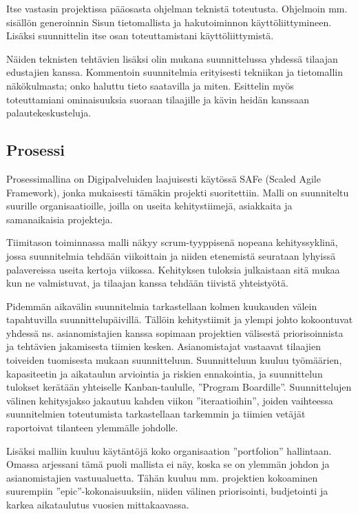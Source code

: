 \documentclass{article}
\begin{document}
Itse vastasin projektissa pääosasta ohjelman teknistä toteutusta. Ohjelmoin mm.
sisällön generoinnin Sisun tietomallista ja hakutoiminnon käyttöliittymineen.
Lisäksi suunnittelin itse osan toteuttamistani käyttöliittymistä.

Näiden teknisten tehtävien lisäksi olin mukana suunnittelussa yhdessä tilaajan
edustajien kanssa. Kommentoin suunnitelmia erityisesti tekniikan ja tietomallin
näkökulmasta; onko haluttu tieto saa\-ta\-vil\-la ja mi\-ten. Esittelin myös
toteuttamiani ominaisuuksia suoraan tilaajille ja kävin heidän kans\-saan
palaute\-kes\-kus\-teluja.

\subsection{Prosessi}

Prosessimallina on Digipalveluiden laajuisesti käytössä SAFe (Scaled Agile
Framework), jonka mu\-kai\-ses\-ti tämäkin projekti suoritettiin. Malli on
suunniteltu suurille organisaatioille, joilla on useita kehitystiimejä,
asiakkaita ja samanaikaisia projekteja.

Tiimitason toiminnassa malli näkyy scrum-tyyppisenä nopeana kehityssyklinä,
jossa suunnitelmia tehdään viikoittain ja niiden etenemistä seurataan lyhyissä
palavereissa useita kertoja viikossa. Kehityksen tuloksia julkaistaan sitä
mukaa kun ne valmistuvat, ja tilaajan kanssa tehdään tiivistä yhteis\-työtä.

Pidemmän aikavälin suunnitelmia tarkastellaan kolmen kuukauden välein
tapahtuvilla suunnittelu\-päivillä. Tällöin kehitystiimit ja ylempi johto
kokoontuvat yhdessä ns. asianomistajien kanssa sopimaan projektien välisestä
priorisoinnista ja tehtävien jakamisesta tiimien kesken. Asianomistajat
vastaavat tilaajien toiveiden tuomisesta mukaan suunnitteluun. Suunnitteluun
kuuluu työmäärien, kapasiteetin ja aikataulun arviointia ja riskien
ennakointia, ja suunnittelun tulokset kerätään yhtei\-selle Kanban-taululle,
''Program Boardille''.  Suunnittelujen välinen kehitysjakso jakautuu kahden
viikon ''iteraatioihin'', joiden vaihteessa suunnitelmien toteutumista
tarkastellaan tarkemmin ja tii\-mien vetä\-jät raportoivat tilanteen ylemmälle
johdolle.

Lisäksi malliin kuuluu käytäntöjä koko organisaation ''portfolion'' hallintaan.
Omassa arjessani tämä puoli mallista ei näy, koska se on ylemmän johdon ja
asianomistajien vastuualuetta. Tähän kuuluu mm. projektien kokoaminen
suurempiin ''epic''-kokonaisuuksiin, niiden välinen priorisointi, budjetointi
ja karkea aikataulutus vuosien mittakaavassa.
\end{document}
